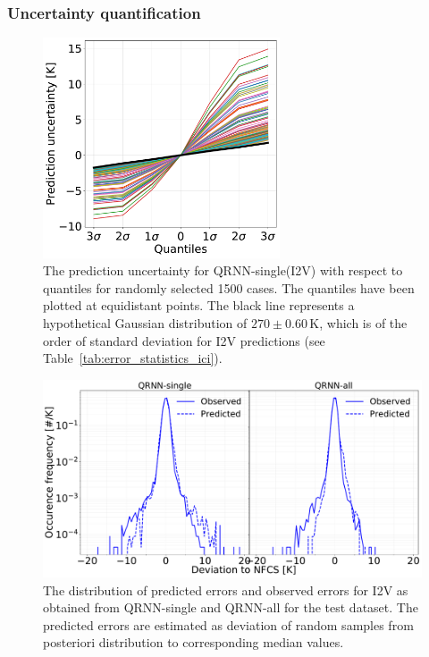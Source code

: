 \documentclass[amt, manuscript]{copernicus}
\begin{document}
\subsubsection{Uncertainty quantification}
\label{sec:prediction_uncertainty}
\begin{figure}[t]
	\includegraphics[width = 70mm]{Figures/prediction_uncertainty_I2V.pdf}	
	\caption{The prediction uncertainty  for QRNN-single(I2V) with respect to quantiles for randomly selected 1500 cases. The quantiles have been plotted at equidistant points. The black line represents a hypothetical Gaussian distribution of $270\pm0.60$\,K, which is of the order of standard deviation for I2V predictions (see Table~\ref{tab:error_statistics_ici}).}
	\label{fig:prediction_uncertainty_I2V}	
\end{figure}
\begin{figure}[t]
	\includegraphics[width=150mm]{Figures/deviation_posterior_samples_I2V.pdf}	
	\caption{The distribution of predicted errors and observed errors for I2V as obtained from QRNN-single and QRNN-all for the test dataset. The predicted errors are estimated as deviation of random samples from posteriori distribution to corresponding median values.}
	\label{fig:predicted_errors}	
\end{figure}
\end{document}
